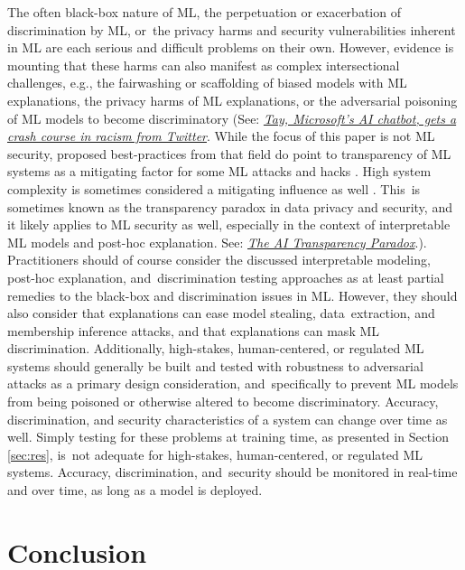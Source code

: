 \documentclass[information,article,accept,moreauthors,pdftex]{Definitions/mdpi}
\begin{document}
{{{The often black-box nature of ML, the perpetuation or exacerbation of discrimination by ML, or~the privacy harms and security vulnerabilities inherent in ML are each serious and difficult problems on their own. However, evidence is mounting that these harms can also manifest as complex intersectional challenges, e.g., the {fairwashing} or {scaffolding} of biased models with ML explanations, the privacy harms of ML explanations, or the adversarial poisoning of ML models to become discriminatory \cite{shokri2019privacy,fair_washing,scaffolding} (See: \href{https://www.theguardian.com/technology/2016/mar/24/tay-microsofts-ai-chatbot-gets-a-crash-course-in-racism-from-twitter} 
 {\textit{Tay, Microsoft's AI chatbot, gets a crash course in racism from Twitter}}.} While the focus of this paper is not ML security, proposed best-practices from that field do point to transparency of ML systems as a mitigating factor for some ML attacks and hacks \cite{papernot2018marauder}. High system complexity is sometimes considered a mitigating influence as well \cite{hoare19811980}. This~is sometimes known as the {transparency paradox} in data privacy and security, and it likely applies to ML security as well, especially in the context of interpretable ML models and post-hoc explanation}. {See: \href{https://hbr.org/2019/12/the-ai-transparency-paradox}{\textit{The AI Transparency Paradox}}.}). Practitioners should of course consider the discussed interpretable modeling, post-hoc explanation, and~discrimination testing approaches as at least partial remedies to the black-box and discrimination issues in ML. However, they should also consider that explanations can ease model stealing, data~extraction, and membership inference attacks, and that explanations can mask ML discrimination. Additionally, high-stakes, human-centered, or regulated ML systems should generally be built and tested with robustness to adversarial attacks as a primary design consideration, and~specifically to prevent ML models from being poisoned or otherwise altered to become discriminatory. Accuracy, discrimination, and security characteristics of a system can change over time as well. Simply testing for these problems at training time, as presented in Section \ref{sec:res}, is~not adequate for high-stakes, human-centered, or regulated ML systems. Accuracy, discrimination, and~security should be monitored in real-time and over time, as long as a model is deployed. %

\section{Conclusion}\label{sec:con}

}
\end{document}
